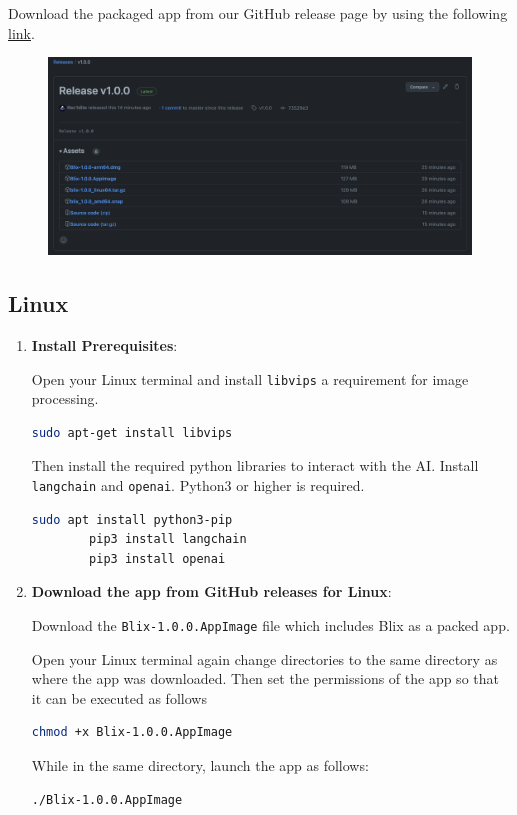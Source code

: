 \documentclass[11pt,a4paper]{article}
\def\code#1{\texttt{#1}}
\begin{document}
Download the packaged app from our GitHub release page by using the following 
	\href{https://github.com/COS301-SE-2023/AI-Photo-Editor/releases/tag/v1.0.0}{link}.
\begin{figure}[ht]
	\centering
	\includegraphics[width=1\textwidth,height=\textheight,keepaspectratio,rotate=0,origin=c]{../pics/github-release.png}
\end{figure}

\subsection*{Linux}

\begin{enumerate}[label*=\arabic*.]
	\item[\textbullet] {\bf Install Prerequisites}: 

	Open your Linux terminal and install \code{libvips} a requirement for
	image processing.

	\begin{lstlisting}[language=sh]
		sudo apt-get install libvips 
	\end{lstlisting}

	Then install the required python libraries to interact with the AI. Install
	\code{langchain} and \code{openai}. Python3 or higher is required.

	\begin{lstlisting}[language=sh]
		sudo apt install python3-pip
		pip3 install langchain
		pip3 install openai
	\end{lstlisting}

	\item[\textbullet] {\bf Download the app from GitHub releases for Linux}: 

	Download the \code{Blix-1.0.0.AppImage} file which includes Blix as a packed app.

	Open your Linux terminal again change directories to the same directory as
	where the app was downloaded. Then set the permissions of the app so that it can
	be executed as follows

	\begin{lstlisting}[language=sh]
		chmod +x Blix-1.0.0.AppImage
	\end{lstlisting}

	While in the same directory, launch the app as follows:

	\begin{lstlisting}[language=sh]
		./Blix-1.0.0.AppImage
	\end{lstlisting}
\end{enumerate}
\end{document}
